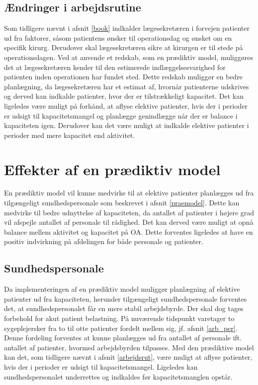 \subsection{Ændringer i arbejdsrutine}\label{arbjedsrut}
Som tidligere nævnt i afsnit \ref{book} indkalder lægesekretæren i forvejen patienter ud fra faktorer, såsom patientens ønsker til operationsdag og ønsket om en specifik kirurg. Derudover skal lægesekretæren sikre at kirurgen er til stede på operationsdagen. Ved at anvende et redskab, som en prædiktiv model, muliggøres det at lægesekretæren kender til den estimerede indlæggelsesvarighed for patienten inden operationen har fundet sted. 
Dette redskab muliggør en bedre planlægning, da lægesekretæren har et estimat af, hvornår patienterne udskrives og derved kan indkalde patienter, hvor der er tilstrækkeligt kapacitet. 
Det kan ligeledes være muligt på forhånd, at aflyse elektive patienter, hvis der i perioder er udsigt til kapacitetsmangel og planlægge genindlægge når der er balance i kapaciteten igen. Derudover kan det være muligt at indkalde elektive patienter i perioder med mere kapacitet end aktivitet. 


\section{Effekter af en prædiktiv model}
En prædiktiv model vil kunne medvirke til at elektive patienter planlægges ud fra tilgængeligt sundhedspersonale som beskrevet i afsnit \ref{praemodel}. Dette kan medvirke til bedre udnyttelse af kapaciteten, da antallet af patienter i højere grad vil afspejle antallet af personale til rådighed. Det kan derved være muligt at opnå balance mellem aktivitet og kapacitet på OA. Dette forventes ligeledes at have en positiv indvirkning på afdelingen for både personale og patienter. 


\subsection{Sundhedspersonale} \label{sundper}
Da implementeringen af en prædiktiv model muliggør planlægning af elektive patienter ud fra kapaciteten, herunder tilgængeligt sundhedspersonale forventes det, at sundhedspersonalet får en mere stabil arbejdsbyrde. Der skal dog tages forbehold for akut patient belastning. På nuværende tidspunkt varetager to sygeplejersker fra to til otte patienter fordelt mellem sig, jf. afsnit \ref{arb_per}. Denne fordeling forventes at kunne planlægges ud fra antallet af personale ift. antallet af patienter, hvormed arbejdsbyrden tilpasses.  Med den prædiktive model kan det, som tidligere nævnt i afsnit \ref{arbejdsrut}, være muligt at aflyse patienter, hvis der i perioder er udsigt til kapacitetsmangel. Ligeledes kan sundhedspersonalet underrettes og indkaldes før kapacitetsmanglen opstår.

